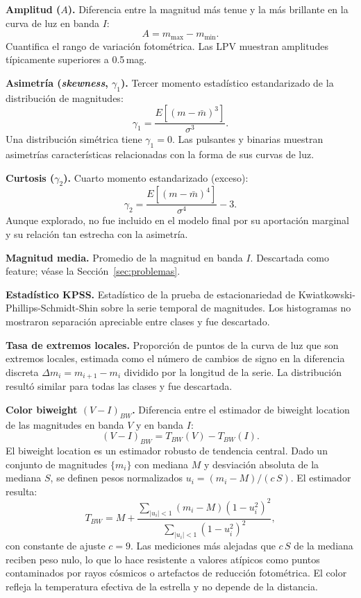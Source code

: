 \documentclass[letterpaper,12pt]{extarticle}
\begin{document}
\textbf{Amplitud ($A$).} Diferencia entre la magnitud más tenue y la más brillante
en la curva de luz en banda $I$:
\begin{equation}
    A = m_{\max} - m_{\min}.
\end{equation}
Cuantifica el rango de variación fotométrica. Las LPV muestran amplitudes
típicamente superiores a 0.5\,mag.

\textbf{Asimetría (\textit{skewness}, $\gamma_1$).} Tercer momento estadístico
estandarizado de la distribución de magnitudes:
\begin{equation}
    \gamma_1 = \frac{E\!\left[(m - \bar{m})^3\right]}{\sigma^3}.
\end{equation}
Una distribución simétrica tiene $\gamma_1 = 0$. Las pulsantes y binarias muestran
asimetrías características relacionadas con la forma de sus curvas de luz.

\textbf{Curtosis ($\gamma_2$).} Cuarto momento estandarizado (exceso):
\begin{equation}
    \gamma_2 = \frac{E\!\left[(m - \bar{m})^4\right]}{\sigma^4} - 3.
\end{equation}
Aunque explorado, no fue incluido en el modelo final por su aportación marginal y su relación tan estrecha con la asimetría.

\textbf{Magnitud media.} Promedio de la magnitud en banda $I$. Descartada como
feature; véase la Sección~\ref{sec:problemas}.

\textbf{Estadístico KPSS.} Estadístico de la prueba de estacionariedad de
Kwiatkowski-Phillips-Schmidt-Shin \citep{kwiatkowski1992} sobre la serie temporal
de magnitudes. Los histogramas no mostraron separación apreciable entre clases y
fue descartado.

\textbf{Tasa de extremos locales.} Proporción de puntos de la curva de luz que son
extremos locales, estimada como el número de cambios de signo en la diferencia
discreta $\Delta m_i = m_{i+1}-m_i$ dividido por la longitud de la serie. La
distribución resultó similar para todas las clases y fue descartada.

\textbf{Color biweight $(V-I)_{BW}$.} Diferencia entre el estimador de biweight
location de las magnitudes en banda $V$ y en banda $I$:
\begin{equation}
    (V-I)_{BW} = T_{BW}(V) - T_{BW}(I).
\end{equation}
El biweight location \citep{beers1990} es un estimador robusto de tendencia central.
Dado un conjunto de magnitudes $\{m_i\}$ con mediana $M$ y desviación absoluta de
la mediana $S$, se definen pesos normalizados $u_i = (m_i-M)/(c\,S)$. El estimador
resulta:
\begin{equation}\label{eq:bw}
    T_{BW} = M + \frac{\displaystyle\sum_{|u_i|<1}(m_i-M)(1-u_i^2)^2}
                      {\displaystyle\sum_{|u_i|<1}(1-u_i^2)^2},
\end{equation}
con constante de ajuste $c=9$. Las mediciones más alejadas que $c\,S$ de la mediana
reciben peso nulo, lo que lo hace resistente a valores atípicos como puntos
contaminados por rayos cósmicos o artefactos de reducción fotométrica. El color
refleja la temperatura efectiva de la estrella y no depende de la distancia.
\end{document}
